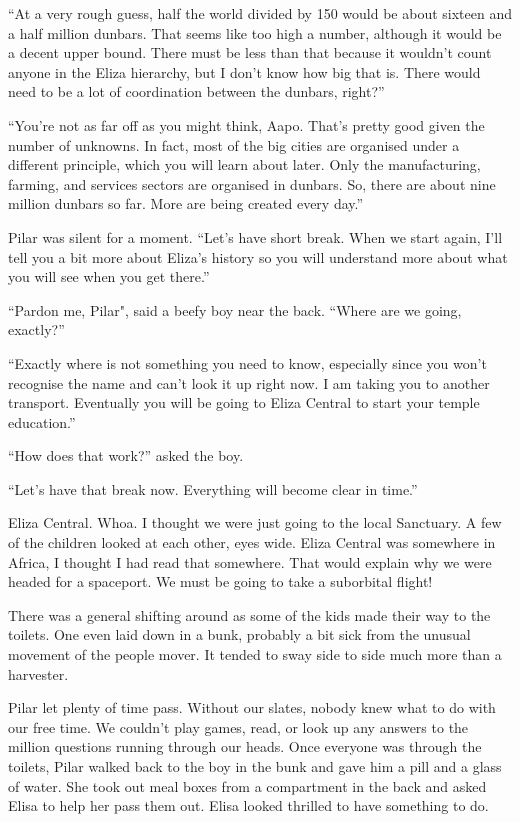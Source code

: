 ``At a very rough guess, half the world divided by 150 would be about sixteen and a half million dunbars. That seems like too high a number, although it would be a decent upper bound. There must be less than that because it wouldn't count anyone in the Eliza hierarchy, but I don't know how big that is. There would need to be a lot of coordination between the dunbars, right?''

``You're not as far off as you might think, Aapo. That's pretty good given the number of unknowns. In fact, most of the big cities are organised under a different principle, which you will learn about later. Only the manufacturing, farming, and services sectors are organised in dunbars. So, there are about nine million dunbars so far. More are being created every day.''

Pilar was silent for a moment. ``Let's have short break. When we start again, I'll tell you a bit more about Eliza's history so you will understand more about what you will see when you get there.''

``Pardon me, Pilar", said a beefy boy near the back. ``Where are we going, exactly?''

``Exactly where is not something you need to know, especially since you won't recognise the name and can't look it up right now. I am taking you to another transport. Eventually you will be going to Eliza Central to start your temple education.''

``How does that work?'' asked the boy.

``Let's have that break now. Everything will become clear in time.''

Eliza Central. Whoa. I thought we were just going to the local Sanctuary. A few of the children looked at each other, eyes wide. Eliza Central was somewhere in Africa, I thought I had read that somewhere. That would explain why we were headed for a spaceport. We must be going to take a suborbital flight!

There was a general shifting around as some of the kids made their way to the toilets. One even laid down in a bunk, probably a bit sick from the unusual movement of the people mover. It tended to sway side to side much more than a harvester.

Pilar let plenty of time pass. Without our slates, nobody knew what to do with our free time. We couldn't play games, read, or look up any answers to the million questions running through our heads. Once everyone was through the toilets, Pilar walked back to the boy in the bunk and gave him a pill and a glass of water. She took out meal boxes from a compartment in the back and asked Elisa to help her pass them out. Elisa looked thrilled to have something to do.

